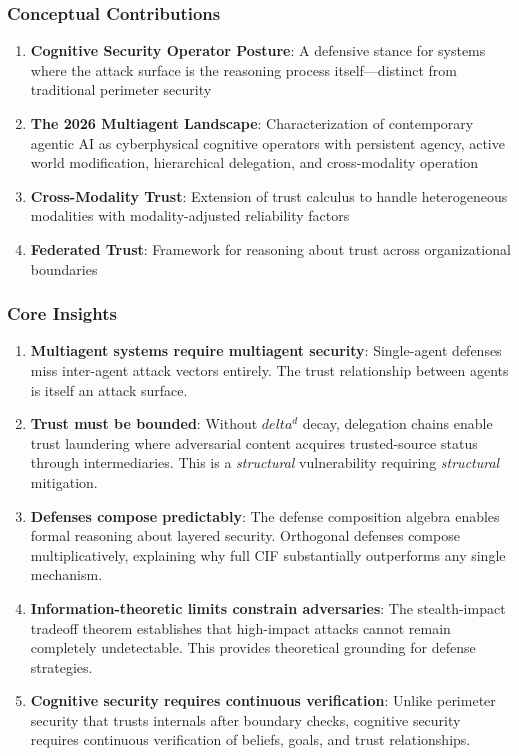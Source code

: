 \documentclass[
]{article}
\begin{document}
\subsubsection{Conceptual Contributions}\label{conceptual-contributions}

\begin{enumerate}
\item \textbf{Cognitive Security Operator Posture}: A defensive stance for systems where the attack surface is the reasoning process itself---distinct from traditional perimeter security
\item \textbf{The 2026 Multiagent Landscape}: Characterization of contemporary agentic AI as cyberphysical cognitive operators with persistent agency, active world modification, hierarchical delegation, and cross-modality operation
\item \textbf{Cross-Modality Trust}: Extension of trust calculus to handle heterogeneous modalities with modality-adjusted reliability factors
\item \textbf{Federated Trust}: Framework for reasoning about trust across organizational boundaries
\end{enumerate}

\subsubsection{Core Insights}\label{core-insights}

\begin{enumerate}
\item \textbf{Multiagent systems require multiagent security}: Single-agent defenses miss inter-agent attack vectors entirely. The trust relationship between agents is itself an attack surface.

\item \textbf{Trust must be bounded}: Without $delta^d$ decay, delegation chains enable trust laundering where adversarial content acquires trusted-source status through intermediaries. This is a \textit{structural} vulnerability requiring \textit{structural} mitigation.

\item \textbf{Defenses compose predictably}: The defense composition algebra enables formal reasoning about layered security. Orthogonal defenses compose multiplicatively, explaining why full CIF substantially outperforms any single mechanism.

\item \textbf{Information-theoretic limits constrain adversaries}: The stealth-impact tradeoff theorem establishes that high-impact attacks cannot remain completely undetectable. This provides theoretical grounding for defense strategies.

\item \textbf{Cognitive security requires continuous verification}: Unlike perimeter security that trusts internals after boundary checks, cognitive security requires continuous verification of beliefs, goals, and trust relationships.
\end{enumerate}
\end{document}
